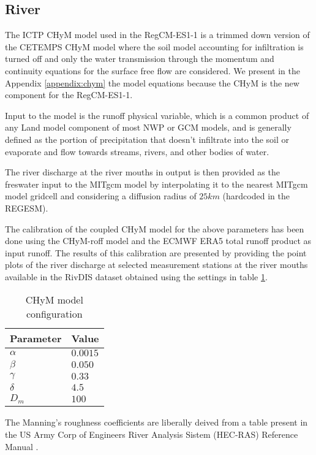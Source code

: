 \documentclass[journal abbreviation, manuscript]{copernicus}
\begin{document}
\subsection{River}

The ICTP CHyM model used in the RegCM-ES1-1 is a trimmed down version of the
CETEMPS CHyM model where the soil model accounting for infiltration is turned
off and only the water transmission through the momentum and continuity
equations for the surface free flow are considered. We present in the
Appendix \ref{appendix:chym} the model equations because the CHyM is the new
component for the RegCM-ES1-1.

Input to the model is the runoff physical variable, which is a common product
of any Land model component of most NWP or GCM models, and is generally defined
as the portion of precipitation that doesn't infiltrate into the soil or
evaporate and flow towards streams, rivers, and other bodies of water.

The river discharge at the river mouths in output is then provided as the
freswater input to the MITgcm model by interpolating it to the nearest MITgcm
model gridcell and considering a diffusion radius of $25 km$
(hardcoded in the REGESM).

The calibration of the coupled CHyM model for the above parameters has been
done using the CHyM-roff model and the ECMWF ERA5 total runoff product as
input runoff. The results of this calibration are presented by providing the
point plots of the river discharge at selected measurement stations at the
river mouths available in the RivDIS dataset obtained using the
settings in table \ref{table:chym_conf}.

\begin{table}[]
    \begin{tabular}{|l|l|}
        \hline
        Parameter & Value \\
        \hline
        $\alpha$ & $0.0015$ \\
        $\beta$ & $0.050$ \\
        $\gamma$ & $0.33$ \\
        $\delta$ & $4.5$ \\
        $D_m$ & $100$ \\
        \hline
  \end{tabular}
    \caption{CHyM model configuration}
    \label{table:chym_conf}
\end{table}

The Manning's roughness coefficients are liberally deived from a table
present in the US Army Corp of Engineers River Analysis Sistem (HEC-RAS)
Reference Manual \citep{brunner-2020} .
\end{document}
